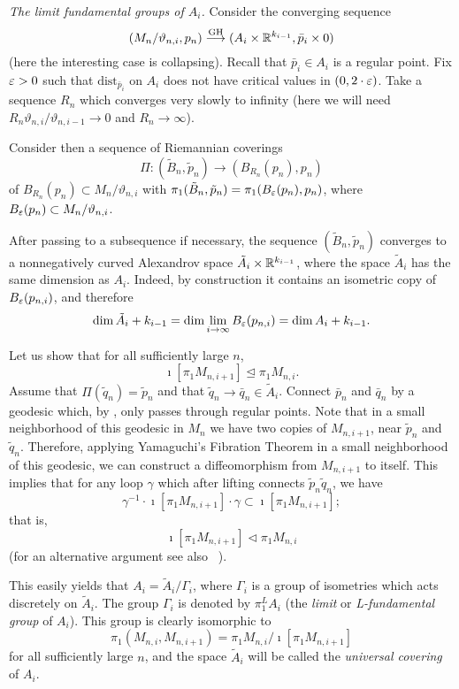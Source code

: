 \documentclass{amsart}
\begin{document}
{\it The limit fundamental groups of $A_i$.} 
Consider the converging sequence
\[(M_{n}/\vartheta_{n,i},p_{n})\GHto (A_i\times {\Bbb R}^{k_{i-1}},\bar p_i\times 0)\]
(here the interesting case is collapsing).
Recall that
$\bar p_i\in A_i$
is a regular point.
Fix $\varepsilon>0$ such that
$\text{dist}_{\bar p_i}$ on $A_i$
does not have critical values in $(0,2\cdot \varepsilon)$.
Take a sequence $R_n$ which converges very slowly to infinity
(here
we will need $R_n\vartheta_{n,i}/\vartheta_{n,i-1}\to 0$ and $R_n\to \infty$).

Consider then
a sequence of Riemannian coverings
$$\Pi\colon (\tilde B_n,\tilde p_n)\to (B_{R_n}(p_n), p_n)$$
of
$B_{R_n}(p_n)\subset {M}_n/\vartheta_{n,i}$ with
$\pi_1(\tilde B_n,\tilde p_n)=\pi_1(B_\varepsilon(p_{n}), p_n)$,
where $B_\varepsilon(p_{n})\subset M_n/\vartheta_{n,i}$.

After passing to a subsequence if necessary,
the sequence $(\tilde B_n,\tilde p_n)$
converges to a nonnegatively curved Alexandrov space
$\tilde A_i\times {\Bbb R}^{k_{i-1}}$,
where the space $\tilde A_i$ has the same dimension as $A_i$.
Indeed, by construction it  contains an isometric copy of
$B_\varepsilon(p_{n,i})$, and therefore
$$\dim \tilde A_i +k_{i-1}=
\dim \lim_{i\to\infty} B_\varepsilon(p_{n,i})=\dim A_i+k_{i-1}.$$

Let us show that for all sufficiently large $n$,
$$\imath[\pi_1M_{n,i+1}]\trianglelefteq\pi_1M_{n,i}.$$
Assume that $\Pi(\tilde q_n)=\tilde p_n$
and that $\tilde q_n\to \bar q_n\in \tilde A_i$.
Connect $\bar p_n$ and $\bar q_n$ by a geodesic
which, by \cite{Ptr3}, only passes  through regular points.
Note that in a small neighborhood  of this geodesic in $M_n$
 we have two copies of $M_{n,i+1}$, near $\tilde p_n$ and $\tilde q_n$.
Therefore,
applying Yamaguchi's  Fibration Theorem
in a small neighborhood  of this geodesic,
we can construct a diffeomorphism from $M_{n,i+1}$ to itself.
This  implies that for any loop $\gamma$ which after lifting
connects $\tilde p_n \tilde q_n$,
we have 
$$\gamma^{-1}\cdot \imath[\pi_1M_{n,i+1}]\cdot
\gamma\subset \imath[\pi_1M_{n,i+1}];$$  
that is,
$$\imath[\pi_1M_{n,i+1}]\lhd\pi_1M_{n,i}$$
(for an alternative argument see also ~\cite{FY}).


This easily yields that $A_i=\tilde A_i/\Gamma_i$,
where $\Gamma_i$ is a group of isometries
which acts %
discretely on $\tilde A_i$.
The group $\Gamma_i$ is denoted  by $\pi_1^LA_i$
(the {\it limit} or {\it L-fundamental group} of $A_i$).
This group  is clearly isomorphic to
$$\pi_1(M_{n,i},M_{n,i+1})=\pi_1M_{n,i}/\imath[ \pi_1M_{n,i+1}]$$
for all sufficiently large $n$, and
the space $\tilde A_i$ will be called the {\it universal covering} of $A_i$.
\end{document}
